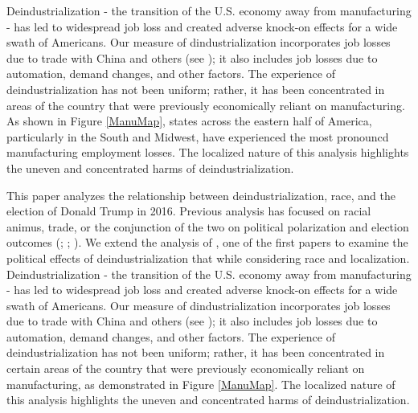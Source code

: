\documentclass[]{AEA}
\begin{document}
Deindustrialization - the transition of the U.S. economy away from
manufacturing - has led to widespread job loss and created adverse
knock-on effects for a wide swath of Americans. Our measure of
dindustrialization incorporates job losses due to trade with China and
others (see \cite{Acemoglu16}); it also includes job losses due to
automation, demand changes, and other factors. The experience of
deindustrialization has not been uniform; rather, it has been
concentrated in areas of the country that were previously economically
reliant on manufacturing. As shown in Figure \ref{ManuMap}, states
across the eastern half of America, particularly in the South and
Midwest, have experienced the most pronouncd manufacturing employment
losses. The localized nature of this analysis highlights the uneven and
concentrated harms of deindustrialization.

This paper analyzes the relationship between deindustrialization, race,
and the election of Donald Trump in 2016. Previous analysis has focused
on racial animus, trade, or the conjunction of the two on political
polarization and election outcomes (\cite{Autor20}; \cite{Che16};
\cite{BR21}). We extend the analysis of \cite{Baccini21}, one of the
first papers to examine the political effects of deindustrialization
that while considering race and localization. Deindustrialization - the
transition of the U.S. economy away from manufacturing - has led to
widespread job loss and created adverse knock-on effects for a wide
swath of Americans. Our measure of dindustrialization incorporates job
losses due to trade with China and others (see \cite{Acemoglu16}); it
also includes job losses due to automation, demand changes, and other
factors. The experience of deindustrialization has not been uniform;
rather, it has been concentrated in certain areas of the country that
were previously economically reliant on manufacturing, as demonstrated
in Figure \ref{ManuMap}. The localized nature of this analysis
highlights the uneven and concentrated harms of deindustrialization.
\end{document}
